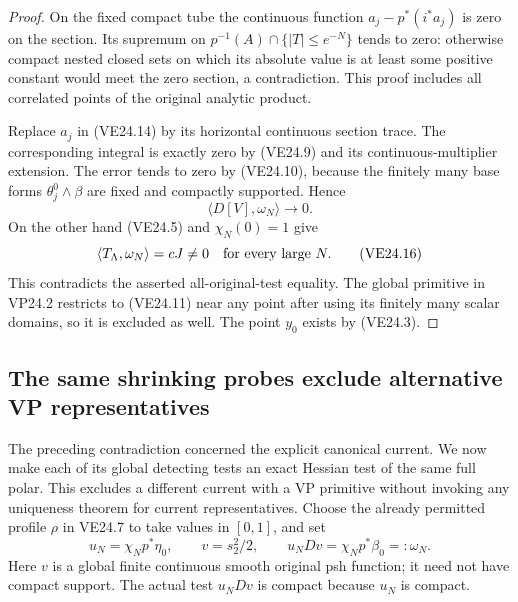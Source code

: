 \begin{proof}
On the fixed compact tube the continuous function
\(a_j-p^*(i^*a_j)\) is zero on the section. Its supremum on
\(p^{-1}(A)\cap\{|T|\le e^{-N}\}\) tends to zero:
otherwise compact nested closed sets on which its absolute
value is at least some positive constant would meet the zero
section, a contradiction. This proof includes all correlated
points of the original analytic product.

Replace \(a_j\) in (VE24.14) by its horizontal continuous
section trace. The corresponding integral is exactly zero by
(VE24.9) and its continuous-multiplier extension. The error
tends to zero by (VE24.10), because the finitely many base
forms \(\theta_j^0\wedge\beta\) are fixed and compactly
supported. Hence
\[
                       \langle D[V],\omega_N\rangle\longrightarrow0.
 \tag{VE24.15}
\]
On the other hand (VE24.5) and \(\chi_N(0)=1\) give
\[
             \langle T_\Lambda,\omega_N\rangle=cJ\ne0
                    \quad\hbox{for every large }N.
 \tag{VE24.16}
\]
This contradicts the asserted all-original-test equality.
The global primitive in VP24.2 restricts to (VE24.11) near
any point after using its finitely many scalar domains, so it
is excluded as well. The point \(y_0\) exists by (VE24.3).
\end{proof}

\subsection{The same shrinking probes exclude alternative VP representatives}

The preceding contradiction concerned the explicit canonical current.
We now make each of its global detecting tests an exact Hessian test
of the same full polar. This excludes a different current with a VP
primitive without invoking any uniqueness theorem for current
representatives. Choose the already permitted profile \(\rho\)
in VE24.7 to take values in \([0,1]\), and set
\[
 u_N=\chi_Np^*\eta_0,\qquad v=s_2^2/2,
 \qquad u_NDv=\chi_Np^*\beta_0=:\omega_N.
 \tag{VE24.17}
\]
Here \(v\) is a global finite continuous smooth original psh
function; it need not have compact support. The actual test
\(u_NDv\) is compact because \(u_N\) is compact.

